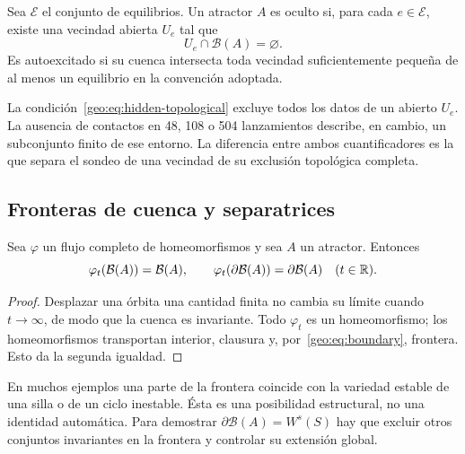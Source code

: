 \begin{definition}
Sea \(\mathcal E\) el conjunto de equilibrios. Un atractor \(A\) es oculto si,
para cada \(e\in\mathcal E\), existe una vecindad abierta \(U_e\) tal que
\begin{equation}
 U_e\cap\mathcal B(A)=\varnothing.
 \label{geo:eq:hidden-topological}
\end{equation}
Es autoexcitado si su cuenca intersecta toda vecindad suficientemente pequeña
de al menos un equilibrio en la convención adoptada.
\end{definition}

La condición~\eqref{geo:eq:hidden-topological} excluye todos los datos de
un abierto \(U_e\). La ausencia de contactos en 48, 108 o 504 lanzamientos
describe, en cambio, un subconjunto finito de ese entorno. La diferencia
entre ambos cuantificadores es la que separa el sondeo de una vecindad de
su exclusión topológica completa.

\subsection{Fronteras de cuenca y separatrices}

\begin{proposition}
Sea \(\varphi\) un flujo completo de homeomorfismos y sea \(A\) un atractor.
Entonces
\begin{equation}
 \varphi_t(\mathcal B(A))=\mathcal B(A),\qquad
 \varphi_t(\partial\mathcal B(A))=\partial\mathcal B(A)
 \quad(t\in\mathbb{R}).
 \label{geo:eq:basin-boundary-invariance}
\end{equation}
\end{proposition}

\begin{proof}
Desplazar una órbita una cantidad finita no cambia su límite cuando
\(t\to\infty\), de modo que la cuenca es invariante. Todo
\(\varphi_t\) es un homeomorfismo; los homeomorfismos transportan interior,
clausura y, por~\eqref{geo:eq:boundary}, frontera. Esto da la segunda igualdad.
\end{proof}



En muchos ejemplos una parte de la frontera coincide con la variedad estable
de una silla o de un ciclo inestable. Ésta es una posibilidad estructural, no
una identidad automática. Para demostrar
\(\partial\mathcal B(A)=W^s(S)\) hay que excluir otros conjuntos invariantes en
la frontera y controlar su extensión global.

